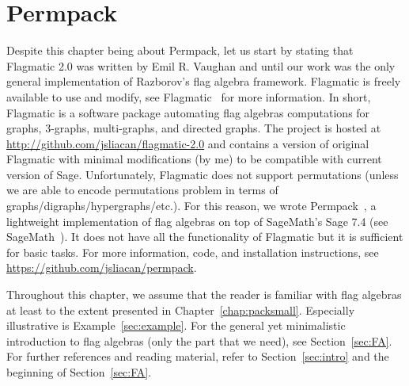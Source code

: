 \documentclass[12pt, a4paper, twoside]{report}
\begin{document}
\chapter{Permpack}
\label{chap:permpack}
% 


Despite this chapter being about Permpack, let us start by stating that Flagmatic 2.0 was written by Emil R. Vaughan and until our work was the only general implementation of Razborov's flag algebra framework. Flagmatic is freely available to use and modify, see Flagmatic~\cite{flagmatic} for more information. In short, Flagmatic is a software package automating flag algebras computations for graphs, $3$-graphs, multi-graphs, and directed graphs. The project is hosted at \url{http://github.com/jsliacan/flagmatic-2.0} and contains a version of original Flagmatic with minimal modifications (by me) to be compatible with current version of Sage. Unfortunately, Flagmatic does not support permutations (unless we are able to encode permutations problem in terms of graphs/digraphs/hypergraphs/etc.). For this reason, we wrote Permpack~\cite{permpack}, a lightweight implementation of flag algebras on top of SageMath's Sage 7.4 (see SageMath~\cite{sagemath}). It does not have all the functionality of Flagmatic but it is sufficient for basic tasks. For more information, code, and installation instructions, see \url{https://github.com/jsliacan/permpack}. 

Throughout this chapter, we assume that the reader is familiar with flag algebras at least to the extent presented in Chapter~\ref{chap:packsmall}. Especially illustrative is Example~\ref{sec:example}. For the general yet minimalistic introduction to flag algebras (only the part that we need), see Section~\ref{sec:FA}. For further references and reading material, refer to Section~\ref{sec:intro} and the beginning of Section~\ref{sec:FA}.

\end{document}
